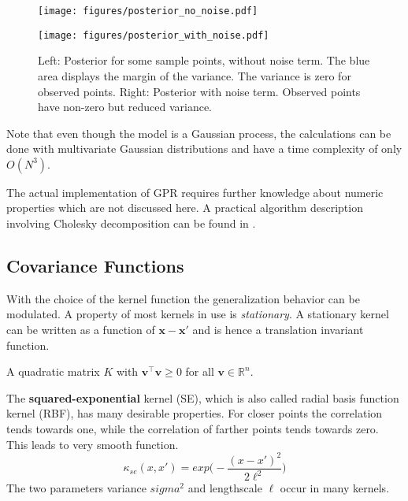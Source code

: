 \documentclass[english]{article}
\newcommand{\x}{\mathbf{x}}
\begin{document}
\begin{figure}

  \begin{minipage}{0.5\textwidth}
  \texttt{[image: figures/posterior\_no\_noise.pdf]}
  \end{minipage}%
  \begin{minipage}{0.5\textwidth}
  \texttt{[image: figures/posterior\_with\_noise.pdf]}
  \end{minipage}%

  \caption{Left: Posterior for some sample points, without noise term. The blue area displays the margin of the variance. The variance is zero for observed points. Right: Posterior with noise term. Observed points have non-zero but reduced variance.}
  \label{gpr}
\end{figure}


Note that even though the model is a Gaussian process, the calculations can be done with multivariate Gaussian distributions and have a time complexity of only $O(N^3)$.

The actual implementation of GPR requires further knowledge about numeric properties which are not discussed here. A practical algorithm description involving Cholesky decomposition can be found in \cite[Algorithm 2.1]{rasmussen_gaussian_2006}.




\subsection{Covariance Functions}
With the choice of the kernel function the generalization behavior can be modulated.  A property of most kernels in use is \textit{stationary}. A stationary kernel can be written as a function of $\x-\x'$ and is hence a translation invariant function.

A quadratic matrix $K$ with $\mathbf{v}^\top \mathbf{v} \ge 0$ for all $\mathbf{v} \in \mathbb{R}^n$.

The \textbf{squared-exponential} kernel (SE), which is also called radial basis function kernel (RBF), has many desirable properties. For closer points the correlation tends towards one, while the correlation of farther points tends towards zero. This leads to very smooth function.
$$\kappa_{se}(x, x') = exp\bigg(-\frac{(x-x')^2}{2\ell^2}\bigg)$$
The two parameters variance $sigma^2$ and lengthscale $\ell$ occur in many kernels.
\end{document}
